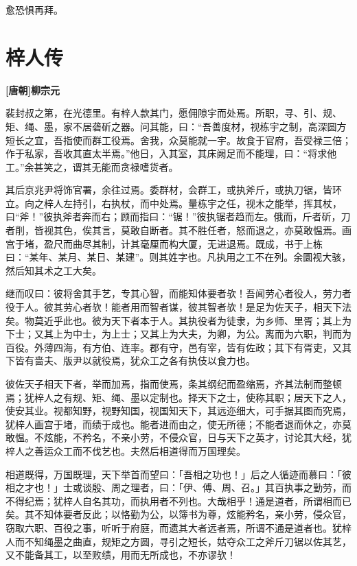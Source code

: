 \documentclass[UTF8,titlepage,oneside]{ctexbook}
\begin{document}
愈恐惧再拜。


\chapter*{梓人传}
\begin{center}
	\textbf{[唐朝]柳宗元}
\end{center}


裴封叔之第，在光德里。有梓人款其门，愿佣隙宇而处焉。所职，寻、引、规、矩、绳、墨，家不居砻斫之器。问其能，曰：“吾善度材，视栋宇之制，高深圆方短长之宜，吾指使而群工役焉。舍我，众莫能就一宇。故食于官府，吾受禄三倍；作于私家，吾收其直太半焉。”他日，入其室，其床阙足而不能理，曰：“将求他工。”余甚笑之，谓其无能而贪禄嗜货者。

其后京兆尹将饰官署，余往过焉。委群材，会群工，或执斧斤，或执刀锯，皆环立。向之梓人左持引，右执杖，而中处焉。量栋宇之任，视木之能举，挥其杖，曰“斧！”彼执斧者奔而右；顾而指曰：“锯！”彼执锯者趋而左。俄而，斤者斫，刀者削，皆视其色，俟其言，莫敢自断者。其不胜任者，怒而退之，亦莫敢愠焉。画宫于堵，盈尺而曲尽其制，计其毫厘而构大厦，无进退焉。既成，书于上栋曰：“某年、某月、某日、某建”。则其姓字也。凡执用之工不在列。余圜视大骇，然后知其术之工大矣。

继而叹曰：彼将舍其手艺，专其心智，而能知体要者欤！吾闻劳心者役人，劳力者役于人。彼其劳心者欤！能者用而智者谋，彼其智者欤！是足为佐天子，相天下法矣。物莫近乎此也。彼为天下者本于人。其执役者为徒隶，为乡师、里胥；其上为下士；又其上为中士，为上士；又其上为大夫，为卿，为公。离而为六职，判而为百役。外薄四海，有方伯、连率。郡有守，邑有宰，皆有佐政；其下有胥吏，又其下皆有啬夫、版尹以就役焉，犹众工之各有执伎以食力也。

彼佐天子相天下者，举而加焉，指而使焉，条其纲纪而盈缩焉，齐其法制而整顿焉；犹梓人之有规、矩、绳、墨以定制也。择天下之士，使称其职；居天下之人，使安其业。视都知野，视野知国，视国知天下，其远迩细大，可手据其图而究焉，犹梓人画宫于堵，而绩于成也。能者进而由之，使无所德；不能者退而休之，亦莫敢愠。不炫能，不矜名，不亲小劳，不侵众官，日与天下之英才，讨论其大经，犹梓人之善运众工而不伐艺也。夫然后相道得而万国理矣。

相道既得，万国既理，天下举首而望曰：「吾相之功也！」后之人循迹而慕曰：「彼相之才也！」士或谈殷、周之理者，曰：「伊、傅、周、召。」其百执事之勤劳，而不得纪焉；犹梓人自名其功，而执用者不列也。大哉相乎！通是道者，所谓相而已矣。其不知体要者反此；以恪勤为公，以簿书为尊，炫能矜名，亲小劳，侵众官，窃取六职、百役之事，听听于府庭，而遗其大者远者焉，所谓不通是道者也。犹梓人而不知绳墨之曲直，规矩之方圆，寻引之短长，姑夺众工之斧斤刀锯以佐其艺，又不能备其工，以至败绩，用而无所成也，不亦谬欤！
\end{document}
